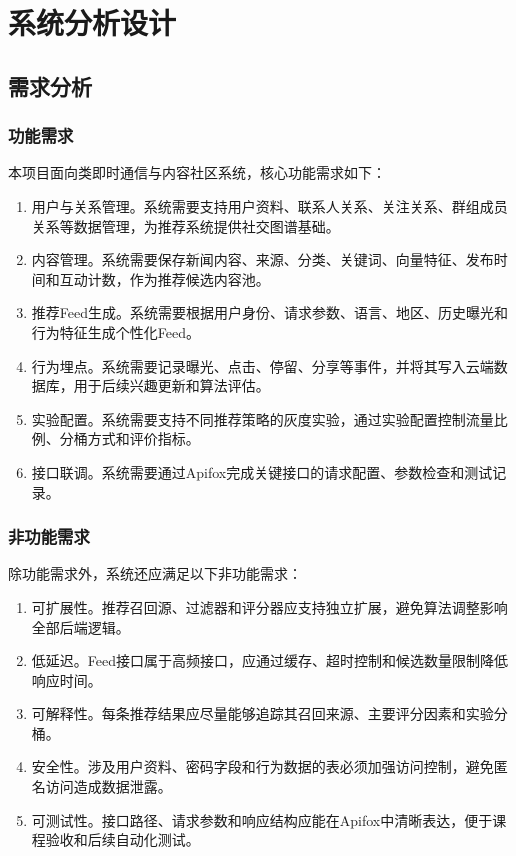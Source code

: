 
\chapter{系统分析设计}

\section{需求分析}

\subsection{功能需求}

本项目面向类即时通信与内容社区系统，核心功能需求如下：

\begin{enumerate}
  \item 用户与关系管理。系统需要支持用户资料、联系人关系、关注关系、群组成员关系等数据管理，为推荐系统提供社交图谱基础。
  \item 内容管理。系统需要保存新闻内容、来源、分类、关键词、向量特征、发布时间和互动计数，作为推荐候选内容池。
  \item 推荐Feed生成。系统需要根据用户身份、请求参数、语言、地区、历史曝光和行为特征生成个性化Feed。
  \item 行为埋点。系统需要记录曝光、点击、停留、分享等事件，并将其写入云端数据库，用于后续兴趣更新和算法评估。
  \item 实验配置。系统需要支持不同推荐策略的灰度实验，通过实验配置控制流量比例、分桶方式和评价指标。
  \item 接口联调。系统需要通过Apifox完成关键接口的请求配置、参数检查和测试记录。
\end{enumerate}

\subsection{非功能需求}

除功能需求外，系统还应满足以下非功能需求：

\begin{enumerate}
  \item 可扩展性。推荐召回源、过滤器和评分器应支持独立扩展，避免算法调整影响全部后端逻辑。
  \item 低延迟。Feed接口属于高频接口，应通过缓存、超时控制和候选数量限制降低响应时间。
  \item 可解释性。每条推荐结果应尽量能够追踪其召回来源、主要评分因素和实验分桶。
  \item 安全性。涉及用户资料、密码字段和行为数据的表必须加强访问控制，避免匿名访问造成数据泄露。
  \item 可测试性。接口路径、请求参数和响应结构应能在Apifox中清晰表达，便于课程验收和后续自动化测试。
\end{enumerate}

